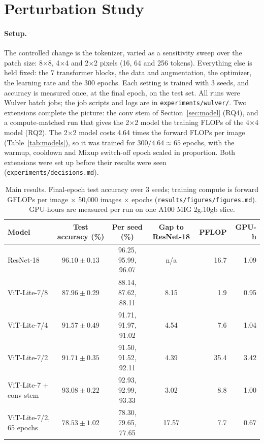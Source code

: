\documentclass[11pt]{article}
\newcommand{\file}[1]{\nolinkurl{#1}}
\begin{document}
\section{Perturbation Study}\label{sec:perturbation}

\paragraph{Setup.} The controlled change is the tokenizer, varied as a sensitivity sweep over the patch size: 8$\times$8, 4$\times$4 and 2$\times$2 pixels (16, 64 and 256 tokens). Everything else is held fixed: the 7 transformer blocks, the data and augmentation, the optimizer, the learning rate and the 300 epochs. Each setting is trained with 3 seeds, and accuracy is measured once, at the final epoch, on the test set. All runs were Wulver batch jobs; the job scripts and logs are in \file{experiments/wulver/}. Two extensions complete the picture: the conv stem of Section~\ref{sec:model} (RQ4), and a compute-matched run that gives the 2$\times$2 model the training FLOPs of the 4$\times$4 model (RQ2). The 2$\times$2 model costs 4.64 times the forward FLOPs per image (Table~\ref{tab:models}), so it was trained for $300/4.64 \approx 65$ epochs, with the warmup, cooldown and Mixup switch-off epoch scaled in proportion. Both extensions were set up before their results were seen (\file{experiments/decisions.md}).

\begin{table}[htbp]
\centering
\small
\caption{Main results. Final-epoch test accuracy over 3 seeds; training compute is forward GFLOPs per image $\times$ 50,000 images $\times$ epochs (\file{results/figures/figures.md}). GPU-hours are measured per run on one A100 MIG 2g.10gb slice.}
\label{tab:main}
\begin{tabular}{@{}lcccrr@{}}
\toprule
Model & Test accuracy (\%) & Per seed (\%) & Gap to ResNet-18 & PFLOP & GPU-h \\
\midrule
ResNet-18 & $96.10 \pm 0.13$ & 96.25, 95.99, 96.07 & n/a & 16.7 & 1.09 \\
\midrule
ViT-Lite-7/8 & $87.96 \pm 0.29$ & 88.14, 87.62, 88.11 & 8.15 & 1.9 & 0.95 \\
ViT-Lite-7/4 & $91.57 \pm 0.49$ & 91.71, 91.97, 91.02 & 4.54 & 7.6 & 1.04 \\
ViT-Lite-7/2 & $91.71 \pm 0.35$ & 91.50, 91.52, 92.11 & 4.39 & 35.4 & 3.42 \\
\midrule
ViT-Lite-7 + conv stem & $93.08 \pm 0.22$ & 92.93, 92.99, 93.33 & 3.02 & 8.8 & 1.00 \\
ViT-Lite-7/2, 65 epochs & $78.53 \pm 1.02$ & 78.30, 79.65, 77.65 & 17.57 & 7.7 & 0.67 \\
\bottomrule
\end{tabular}
\end{table}
\end{document}
